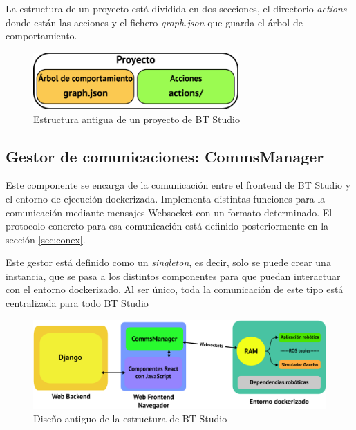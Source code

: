 La estructura de un proyecto está dividida en dos secciones, el directorio \textit{actions} donde están las acciones y el fichero \textit{graph.json} que guarda el árbol de comportamiento. 

\begin{figure}[H]
    \centering
    \includegraphics[width=0.7\textwidth]{figures/bt-studio/bt-proy-old.png}
    \caption{Estructura antigua de un proyecto de BT Studio}
    \label{fig:estructura-antigua}
\end{figure}


\subsection{Gestor de comunicaciones: CommsManager}

Este componente se encarga de la comunicación entre el frontend de BT Studio y el entorno de ejecución dockerizada. Implementa distintas funciones para la comunicación mediante mensajes Websocket con un formato determinado. El protocolo concreto para esa comunicación está definido posteriormente en la sección \ref{sec:conex}. 

Este gestor está definido como un \textit{singleton}, es decir, solo se puede crear una instancia, que se pasa a los distintos componentes para que puedan interactuar con el entorno dockerizado. Al ser único, toda la comunicación de este tipo está centralizada para todo BT Studio

\begin{figure}[H]
    \centering
    \includegraphics[width=\textwidth]{figures/bt-studio/bt-structure-old.png}
    \caption{Diseño antiguo de la estructura de BT Studio}
    \label{fig:bt-old-old-ref}
\end{figure}